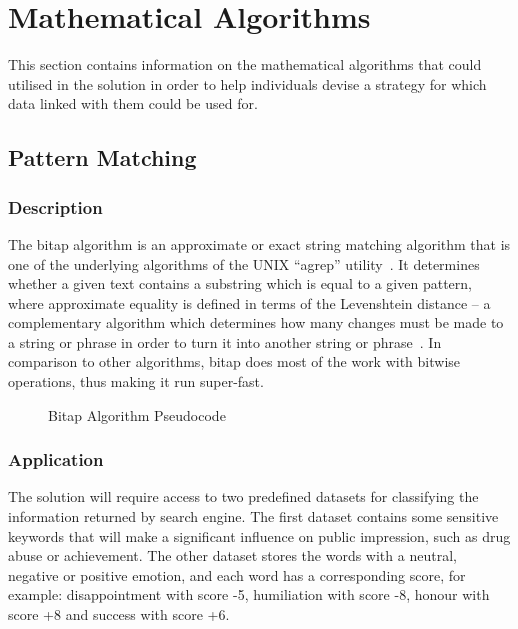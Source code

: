 \section{Mathematical Algorithms}

  This section contains information on the mathematical algorithms that could utilised in the solution in order to help individuals devise a strategy for which data linked with them could be used for.

  \subsection{Pattern Matching}

    \subsubsection{Description}

      The bitap algorithm is an approximate or exact string matching algorithm that is one of the underlying algorithms of the UNIX ``agrep'' utility~\cite{}. It determines whether a given text contains a substring which is equal to a given pattern, where approximate equality is defined in terms of the Levenshtein distance – a complementary algorithm which determines how many changes must be made to a string or phrase in order to turn it into another string or phrase~\cite{}. In comparison to other algorithms, bitap does most of the work with bitwise operations, thus making it run super-fast.

      \begin{figure}
        \centering
        \begin{minipage}{14cm}
          \centering
          \caption{Bitap Algorithm Pseudocode}
          \label{fig:bitap_algorithm_pseudocode}
        \end{minipage}
      \end{figure}

    \subsubsection{Application}

      The solution will require access to two predefined datasets for classifying the information returned by search engine. The first dataset contains some sensitive keywords that will make a significant influence on public impression, such as drug abuse or achievement. The other dataset stores the words with a neutral, negative or positive emotion, and each word has a corresponding score, for example: disappointment with score -5, humiliation with score -8, honour with score +8 and success with score +6. 

